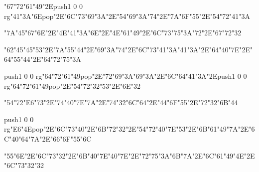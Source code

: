 \centerline{\ipa\char"67\ipa\char"72\ipa\char"61\ipa\char"49\ipa\char"2E\pdfcolorstack\match push{1 0 0 rg}\ipa\char"41\ipa\char"3A\ipa\char"6E\pdfcolorstack\match pop{}\ipa\char"2E\ipa\char"6C\ipa\char"73\ipa\char"69\ipa\char"3A\ipa\char"2E\ipa\char"54\ipa\char"69\ipa\char"3A\ipa\char"74\ipa\char"2E\ipa\char"7A\ipa\char"6F\ipa\char"55\ipa\char"2E\ipa\char"54\ipa\char"72\ipa\char"41\ipa\char"3A}
\vfill\eject
\null\vfill
\centerline{\ipa\char"7A\ipa\char"45\ipa\char"67\ipa\char"6E\ipa\char"2E\ipa\char"4E\ipa\char"41\ipa\char"3A\ipa\char"6E\ipa\char"2E\ipa\char"4E\ipa\char"61\ipa\char"49\ipa\char"2E\ipa\char"6C\ipa\char"73\ipa\char"75\ipa\char"3A\ipa\char"72\ipa\char"2E\ipa\char"67\ipa\char"72\ipa\char"32}\bigskip
\centerline{\ipa\char"62\ipa\char"45\ipa\char"45\ipa\char"53\ipa\char"2E\ipa\char"7A\ipa\char"55\ipa\char"44\ipa\char"2E\ipa\char"69\ipa\char"3A\ipa\char"74\ipa\char"2E\ipa\char"6C\ipa\char"73\ipa\char"41\ipa\char"3A\ipa\char"41\ipa\char"3A\ipa\char"2E\ipa\char"64\ipa\char"40\ipa\char"7E\ipa\char"2E\ipa\char"64\ipa\char"55\ipa\char"44\ipa\char"2E\ipa\char"64\ipa\char"72\ipa\char"75\ipa\char"3A}\bigskip
\centerline{\pdfcolorstack\match push{1 0 0 rg}\ipa\char"64\ipa\char"72\ipa\char"61\ipa\char"49\pdfcolorstack\match pop{}\ipa\char"2E\ipa\char"72\ipa\char"69\ipa\char"3A\ipa\char"69\ipa\char"3A\ipa\char"2E\ipa\char"6C\ipa\char"64\ipa\char"41\ipa\char"3A\ipa\char"2E\pdfcolorstack\match push{1 0 0 rg}\ipa\char"64\ipa\char"72\ipa\char"61\ipa\char"49\pdfcolorstack\match pop{}\ipa\char"2E\ipa\char"54\ipa\char"72\ipa\char"32\ipa\char"53\ipa\char"2E\ipa\char"6E\ipa\char"32}
\vfill\eject
\null\vfill
\centerline{\ipa\char"54\ipa\char"72\ipa\char"E6\ipa\char"73\ipa\char"2E\ipa\char"74\ipa\char"40\ipa\char"7E\ipa\char"7A\ipa\char"2E\ipa\char"74\ipa\char"32\ipa\char"6C\ipa\char"64\ipa\char"2E\ipa\char"44\ipa\char"6F\ipa\char"55\ipa\char"2E\ipa\char"72\ipa\char"32\ipa\char"6B\ipa\char"44}\bigskip
\centerline{\pdfcolorstack\match push{1 0 0 rg}\ipa\char"E6\ipa\char"4E\pdfcolorstack\match pop{}\ipa\char"2E\ipa\char"6C\ipa\char"73\ipa\char"40\ipa\char"2E\ipa\char"6B\ipa\char"72\ipa\char"32\ipa\char"2E\ipa\char"54\ipa\char"72\ipa\char"40\ipa\char"7E\ipa\char"53\ipa\char"2E\ipa\char"6B\ipa\char"61\ipa\char"49\ipa\char"7A\ipa\char"2E\ipa\char"6C\ipa\char"40\ipa\char"64\ipa\char"7A\ipa\char"2E\ipa\char"66\ipa\char"6F\ipa\char"55\ipa\char"6C}\bigskip
\centerline{\ipa\char"55\ipa\char"6E\ipa\char"2E\ipa\char"6C\ipa\char"73\ipa\char"32\ipa\char"2E\ipa\char"6B\ipa\char"40\ipa\char"7E\ipa\char"40\ipa\char"7E\ipa\char"2E\ipa\char"72\ipa\char"75\ipa\char"3A\ipa\char"6B\ipa\char"7A\ipa\char"2E\ipa\char"6C\ipa\char"61\ipa\char"49\ipa\char"4E\ipa\char"2E\ipa\char"6C\ipa\char"73\ipa\char"32\ipa\char"32}
